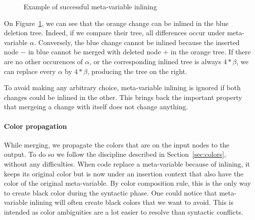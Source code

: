 \documentclass[a4paper,11pt]{article}
\begin{document}
\begin{figure}[ht]
\begin{minipage}{0.49\textwidth}
\end{minipage}
\caption{Example of successful meta-variable inlining}
\label{fig:metavar_inlining}
\end{figure}

On Figure~\ref{fig:metavar_inlining}, we can see that the orange change can be inlined in the blue deletion tree. Indeed, if we compare their tree, all differences occur under meta-variable $\alpha$. Conversely, the blue change cannot be inlined because the inserted node $-$ in blue cannot be merged with deleted node $+$ in the orange tree. If there are no other occurences of $\alpha$, or the corresponding inlined tree is always $4*\beta$, we can replace every $\alpha$ by $4*\beta$, producing the tree on the right.

To avoid making any arbitrary choice, meta-variable inlining is ignored if both changes could be inlined in the other. This brings back the important property that mergeing a change with itself does not change anything.

\paragraph{Color propagation}
While merging, we propagate the colors that are on the input nodes to the output. To do so we follow the discipline described in Section~\ref{sec:colors}, without any difficulties. When code replace a meta-variable because of inlining, it keeps its original color but is now under an insertion context that also have the color of the original meta-variable. By color composition rule, this is the only way to create black color during the syntactic phase. One could notice that meta-variable inlining will often create black colors that we want to avoid. This is intended as color ambiguities are a lot easier to resolve than syntactic conflicts.
\end{document}
